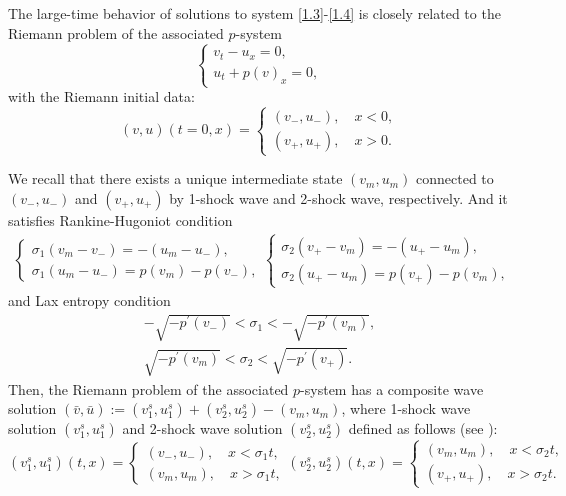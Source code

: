 \documentclass[10pt,reqno]{amsart}
\numberwithin{equation}{section}
\begin{document}
The large-time behavior of solutions to system \eqref{1.3}-\eqref{1.4} is closely
related to the Riemann problem of the associated $p$-system
\begin{equation}\label{1.5}
\begin{cases}
v_t-u_x=0,\\
u_t+p(v)_x=0,
\end{cases}
\end{equation}
with the Riemann initial data:
\begin{equation}\label{1.6}
(v,u)(t=0,x)=
\begin{cases}
(v_-,u_-),\quad x<0,\\
(v_+,u_+),\quad x>0.
\end{cases}
\end{equation}

We recall that there exists a unique intermediate state $(v_m, u_m)$ connected to $(v_- ,u_-)$ and $(v_+, u_+)$ by 1-shock wave and 2-shock wave, respectively. And it satisfies Rankine-Hugoniot condition
\begin{equation}\label{3.15-1}
\begin{aligned}
\begin{cases}
\sigma_1(v_m-v_-)=-(u_m-u_-),\\
\sigma_1(u_m-u_-)=p(v_m)-p(v_-),
\end{cases}
\begin{cases}
\sigma_2(v_+-v_m)=-(u_+-u_m),\\
\sigma_2(u_+-u_m)=p(v_+)-p(v_m),
\end{cases}
\end{aligned}
\end{equation}
and Lax entropy condition
\begin{equation}\label{3.15-2}
\begin{aligned}
-\sqrt{-p^\prime(v_-)}<\sigma_1<-\sqrt{-p^\prime(v_m)},\\
\sqrt{-p^\prime(v_m)}<\sigma_2<\sqrt{-p^\prime(v_+)}.
\end{aligned}
\end{equation}
Then, the Riemann problem of the associated $p$-system has a composite wave solution $(\bar{v}, \bar{u}):=(v_1^s, u_1^s)+(v_2^s, u_2^s)-(v_m, u_m)$, where 1-shock wave solution $(v_1^s, u_1^s)$ and 2-shock wave solution $(v_2^s, u_2^s)$ defined as follows (see \cite{SMO}):
\[
(v_1^s, u_1^s)(t, x)=
\begin{cases}
(v_- ,u_-),\quad x<\sigma_1t,\\
(v_m ,u_m),\quad x>\sigma_1t,
\end{cases}
(v_2^s, u_2^s)(t, x)=
\begin{cases}
(v_m ,u_m),\quad x<\sigma_2t,\\
(v_+ ,u_+),\quad x>\sigma_2t.
\end{cases}
\]
\end{document}
